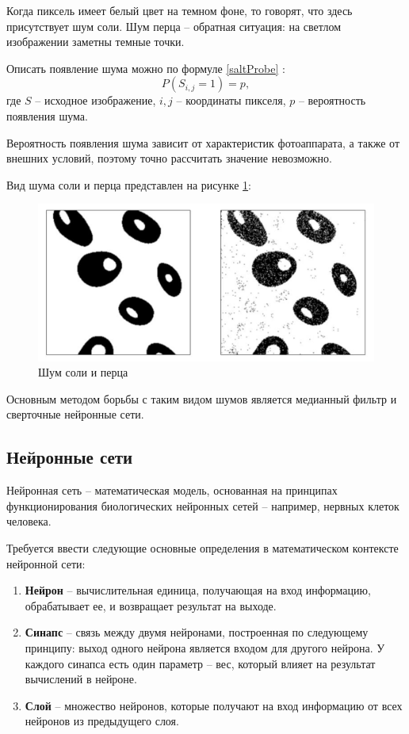 Когда пиксель имеет белый цвет на темном фоне, то говорят, что здесь присутствует шум соли.
Шум перца -- обратная ситуация: на светлом изображении заметны темные точки.

Описать появление шума можно по формуле \eqref{saltProbe} \cite{moments}: 
\begin{equation}
	\label{saltProbe}
	P(S_{i, j} = 1) = p,
\end{equation}
где $S$ -- исходное изображение, $i, j$ -- координаты пикселя, $p$ -- вероятность появления шума. 

Вероятность появления шума зависит от характеристик фотоаппарата, а также от внешних условий, поэтому точно рассчитать значение невозможно.

Вид шума соли и перца представлен на рисунке \ref{fig::salt}:
\FloatBarrier
\begin{figure}[h]	
	\begin{center}
		\includegraphics[width=\linewidth]{inc/png/salt.png}
	\end{center}
	\captionsetup{justification=centering}
	\caption{Шум соли и перца}
	\label{fig::salt}
\end{figure}
\FloatBarrier

Основным методом борьбы с таким видом шумов является медианный фильтр и сверточные нейронные сети.

\subsection{Нейронные сети}
Нейронная сеть -- математическая модель, основанная на принципах функционирования биологических нейронных сетей -- например, нервных клеток человека.

Требуется ввести следующие основные определения в математическом контексте нейронной сети:
\begin{enumerate}
	\item \textbf{Нейрон} -- вычислительная единица, получающая на вход информацию, обрабатывает ее, и возвращает результат на выходе.
	\item \textbf{Синапс} -- связь между двумя нейронами, построенная по следующему принципу: выход одного нейрона является входом для другого нейрона. 
	У каждого синапса есть один параметр -- вес, который влияет на результат вычислений в нейроне.
	\item \textbf{Слой} -- множество нейронов, которые получают на вход информацию от всех нейронов из предыдущего слоя.
\end{enumerate}

